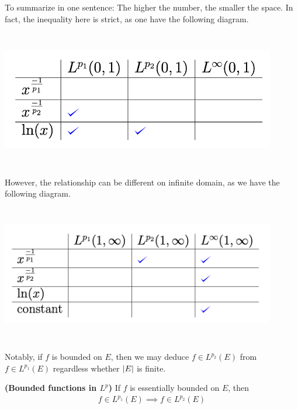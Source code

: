 \documentclass{report}
\begin{document}
\begin{mdframed}
To summarize  in one sentence: The higher the number, the smaller the space.  In fact, the inequality here is strict, as one have the following diagram.  
\begin{center}
   \begin{minipage}{0.9\linewidth}  
       \centering
       \includegraphics[height=6cm,width=12cm]{ga2}
   \end{minipage}
\end{center}
However, the relationship can be different on infinite domain, as we have the following diagram.  
\begin{center}
   \begin{minipage}{0.9\linewidth}  
       \centering
       \includegraphics[height=6cm,width=12cm]{ga3}
   \end{minipage}
\end{center}
Notably, if $f$ is bounded on $E$, then we may deduce  $f \in L^{p_2}(E)$ from $f \in L^{p_1}(E)$ regardless whether $\left|E\right|$ is finite.
\end{mdframed}
\begin{theorem}
\textbf{(Bounded functions in $L^p$)} If $f$ is essentially bounded on  $E$, then 
\begin{align*}
f\in L^{p_1}(E) \implies  f\in L^{p_2}(E)
\end{align*}
\end{theorem}
\end{document}
